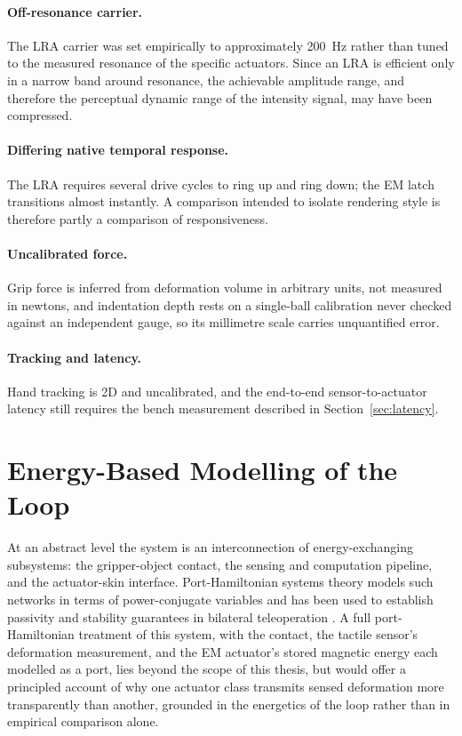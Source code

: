 \documentclass[12pt, a4paper, twoside, openright]{report}
\begin{document}
\paragraph{Off-resonance carrier.} The LRA carrier was set empirically to
approximately \SI{200}{\hertz} rather than tuned to the measured resonance of
the specific actuators. Since an LRA is efficient only in a narrow band around
resonance, the achievable amplitude range, and therefore the perceptual dynamic
range of the intensity signal, may have been compressed.

\paragraph{Differing native temporal response.} The LRA requires several drive
cycles to ring up and ring down; the EM latch transitions almost instantly. A
comparison intended to isolate rendering style is therefore partly a comparison
of responsiveness.

\paragraph{Uncalibrated force.} Grip force is inferred from deformation volume
in arbitrary units, not measured in newtons, and indentation depth rests on a
single-ball calibration never checked against an independent gauge, so its
millimetre scale carries unquantified error.

\paragraph{Tracking and latency.} Hand tracking is 2D and uncalibrated, and the
end-to-end sensor-to-actuator latency still requires the bench measurement
described in Section~\ref{sec:latency}.

\section{Energy-Based Modelling of the Loop}
\label{sec:phs}

At an abstract level the system is an interconnection of energy-exchanging
subsystems: the gripper-object contact, the sensing and computation pipeline,
and the actuator-skin interface. Port-Hamiltonian systems theory models such
networks in terms of power-conjugate variables and has been used to establish
passivity and stability guarantees in bilateral teleoperation \cite{secchi2007}. A full
port-Hamiltonian treatment of this system, with the contact, the tactile
sensor's deformation measurement, and the EM actuator's stored magnetic energy
each modelled as a port, lies beyond the scope of this thesis, but would
offer a principled account of why one actuator class transmits sensed
deformation more transparently than another, grounded in the energetics of the
loop rather than in empirical comparison alone.
\end{document}
